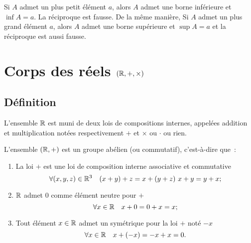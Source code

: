 Si \(A\) admet un plus petit élément \(a\), alors \(A\) admet une borne 
inférieure et \(\inf A=a\). La réciproque est fausse. De la même manière, Si 
\(A\) admet un plus grand élément \(a\), alors \(A\) admet une borne supérieure 
et \(\sup A=a\) et la réciproque est aussi fausse.

\section{Corps des réels \((\mathbb{R},+,\times)\)}

\subsection{Définition}

L'ensemble \(\mathbb{R}\) est muni de deux lois de compositions internes, appelées 
addition et multiplication notées respectivement \(+\) et \(\times\) ou 
\(\cdot\) ou rien.
\begin{prop}
  L'ensemble \((\mathbb{R},+)\) est un groupe abélien (ou commutatif), c'est-à-dire 
  que~:
  \begin{enumerate}
    \item La loi \(+\) est une loi de composition interne associative et 
      commutative
      \begin{equation}
        \forall (x,y,z) \in \R^3 \quad (x+y)+z=x+(y+z) \ x+y=y+x;
      \end{equation}
    \item \(\mathbb{R}\) admet \(0\) comme élément neutre pour \(+\)
      \begin{equation}
        \forall x \in \mathbb{R} \quad x+0=0+x=x;
      \end{equation}
    \item Tout élément \(x\in\mathbb{R}\) admet un symétrique pour la loi \(+\) noté 
      \(-x\)
      \begin{equation}
        \forall x \in \mathbb{R} \quad x+(-x)=-x+x=0.
      \end{equation}
  \end{enumerate}
\end{prop}
